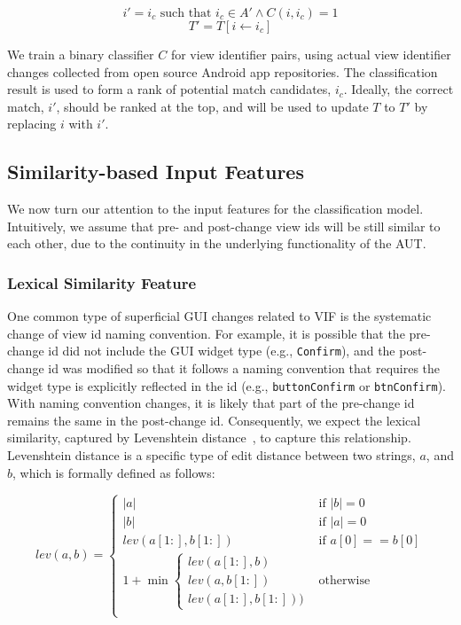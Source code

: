 \documentclass[sigconf]{acmart}
\begin{document}
\[i' = i_c \mbox{ such that } i_c \in A' \wedge C(i, i_c) = 1\]
\[T' = T[i \leftarrow i_c]\]

We train a binary classifier $C$ for view identifier pairs, using actual view
identifier changes collected from open source Android app repositories. The
classification result is used to form a rank of potential match candidates,
$i_c$. Ideally, the correct match, $i'$, should be ranked at the top, and will
be used to update $T$ to $T'$ by replacing $i$ with $i'$.

\subsection{Similarity-based Input Features}
\label{sec:features}

We now turn our attention to the input features for the classification model.
Intuitively, we assume that pre- and post-change view ids will be still
similar to each other, due to the continuity in the underlying functionality
of the AUT.

\subsubsection{Lexical Similarity Feature}
\label{sec:lexical}

One common type of superficial GUI changes related to VIF is the systematic
change of view id naming convention. For example, it is possible that
the pre-change id did not include the GUI widget type (e.g., \lstinline+Confirm+), and the post-change id was modified so that it follows a naming convention
that requires the widget type is explicitly reflected in the id (e.g.,
\lstinline+buttonConfirm+ or \lstinline+btnConfirm+). With naming convention
changes, it is likely that part of the pre-change id remains the same in the
post-change id. Consequently, we expect the lexical similarity, captured
by Levenshtein distance~\cite{Levenshtein:1966sf}, to capture this
relationship. Levenshtein distance is a specific type of edit distance between
two strings, $a$, and $b$, which is formally defined as follows:

\begin{equation}
  lev(a, b) = \left\{\begin{array}{ll}
    |a|                                             & \mbox{if } |b| = 0      \\
    |b|                                             & \mbox{if } |a| = 0      \\
    lev(a[1:], b[1:])                               & \mbox{if } a[0] == b[0] \\
    1 + \min\left\{\begin{array}{l}lev(a[1:], b)\\lev(a, b[1:])\\lev(a[1:], b[1:]))\end{array}\right. & \mbox{otherwise}        \\
  \end{array}\right.
  \label{eq:lev}
\end{equation}
\end{document}
